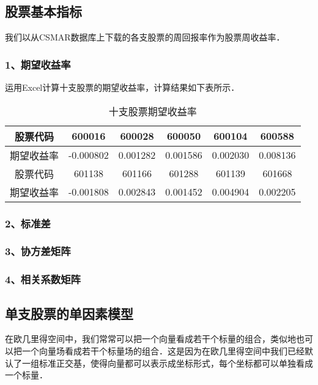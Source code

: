 
\subsection{股票基本指标}
我们以从CSMAR数据库上下载的各支股票的周回报率作为股票周收益率．
\subsubsection{1、期望收益率}
运用Excel计算十支股票的期望收益率，计算结果如下表所示．

\begin{table}[ht]
\centering
\caption{十支股票期望收益率}\label{HW_tab1}
\begin{tabular}{|c|c|c|c|c|c|}
\hline
股票代码 &600016 & 600028 & 600050 & 600104 &	600588 \\
\hline
期望收益率 &-0.000802&0.001282&0.001586&0.002030&0.008136\\
\hline
股票代码 &601138&601166&601288&601139&601668\\
\hline
期望收益率&-0.001808&0.002843&0.001452&0.004904&0.002205\\
\hline
\end{tabular}
\end{table}

\subsubsection{2、标准差}
\subsubsection{3、协方差矩阵}
\subsubsection{4、相关系数矩阵}

\subsection{单支股票的单因素模型}
在欧几里得空间中，我们常常可以把一个向量看成若干个标量的组合，类似地也可以把一个向量场看成若干个标量场的组合．这是因为在欧几里得空间中我们已经默认了一组标准正交基，使得向量都可以表示成坐标形式，每个坐标都可以单独看成一个标量．
